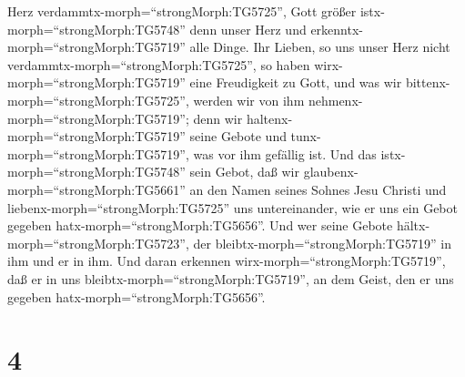 Herz verdammtx-morph=``strongMorph:TG5725'', Gott größer
istx-morph=``strongMorph:TG5748'' denn unser Herz und
erkenntx-morph=``strongMorph:TG5719'' alle Dinge.  Ihr
Lieben, so uns unser Herz nicht verdammtx-morph=``strongMorph:TG5725'',
so haben wirx-morph=``strongMorph:TG5719'' eine Freudigkeit zu Gott,
 und was wir bittenx-morph=``strongMorph:TG5725'', werden
wir von ihm nehmenx-morph=``strongMorph:TG5719''; denn wir
haltenx-morph=``strongMorph:TG5719'' seine Gebote und
tunx-morph=``strongMorph:TG5719'', was vor ihm gefällig ist.
 Und das istx-morph=``strongMorph:TG5748'' sein Gebot, daß
wir glaubenx-morph=``strongMorph:TG5661'' an den Namen seines Sohnes
Jesu Christi und liebenx-morph=``strongMorph:TG5725'' uns untereinander,
wie er uns ein Gebot gegeben hatx-morph=``strongMorph:TG5656''.
 Und wer seine Gebote hältx-morph=``strongMorph:TG5723'',
der bleibtx-morph=``strongMorph:TG5719'' in ihm und er in ihm. Und daran
erkennen wirx-morph=``strongMorph:TG5719'', daß er in uns
bleibtx-morph=``strongMorph:TG5719'', an dem Geist, den er uns gegeben
hatx-morph=``strongMorph:TG5656''.

\hypertarget{section-3}{%
\section{4}\label{section-3}}

